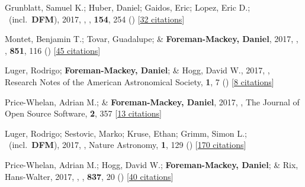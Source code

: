 \item[{\color{numcolor}\scriptsize30}] Grunblatt, Samuel K.; Huber, Daniel; Gaidos, Eric; Lopez, Eric D.; \etal\ (incl.\ \textbf{DFM}), 2017, , \aj, \textbf{154}, 254 () [\href{https://ui.adsabs.harvard.edu/abs/2017AJ....154..254G}{32 citations}]

\item[{\color{numcolor}\scriptsize29}] Montet, Benjamin T.; Tovar, Guadalupe; \& \textbf{Foreman-Mackey, Daniel}, 2017, , \apj, \textbf{851}, 116 () [\href{https://ui.adsabs.harvard.edu/abs/2017ApJ...851..116M}{45 citations}]

\item[{\color{numcolor}\scriptsize28}] Luger, Rodrigo; \textbf{Foreman-Mackey, Daniel}; \& Hogg, David W., 2017, , Research Notes of the American Astronomical Society, \textbf{1}, 7 () [\href{https://ui.adsabs.harvard.edu/abs/2017RNAAS...1....7L}{8 citations}]

\item[{\color{numcolor}\scriptsize27}] Price-Whelan, Adrian M.; \& \textbf{Foreman-Mackey, Daniel}, 2017, , The Journal of Open Source Software, \textbf{2}, 357 [\href{https://ui.adsabs.harvard.edu/abs/2017JOSS....2..357P}{13 citations}]

\item[{\color{numcolor}\scriptsize26}] Luger, Rodrigo; Sestovic, Marko; Kruse, Ethan; Grimm, Simon L.; \etal\ (incl.\ \textbf{DFM}), 2017, , Nature Astronomy, \textbf{1}, 129 () [\href{https://ui.adsabs.harvard.edu/abs/2017NatAs...1E.129L}{170 citations}]

\item[{\color{numcolor}\scriptsize25}] Price-Whelan, Adrian M.; Hogg, David W.; \textbf{Foreman-Mackey, Daniel}; \& Rix, Hans-Walter, 2017, , \apj, \textbf{837}, 20 () [\href{https://ui.adsabs.harvard.edu/abs/2017ApJ...837...20P}{40 citations}]

